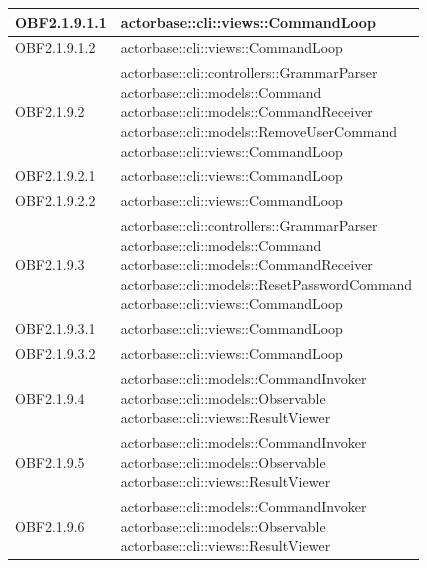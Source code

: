 \documentclass{scalatekids-article}
\begin{document}
\begin{longtable}[H]{|p{4.5cm}|p{13cm}|}
  \hline
  OBF2.1.9.1.1 & \multiLineCell[t]{actorbase::cli::views::CommandLoop\\}\\
  \hline
  OBF2.1.9.1.2 & \multiLineCell[t]{actorbase::cli::views::CommandLoop\\}\\
  \hline
  OBF2.1.9.2 & \multiLineCell[t]{actorbase::cli::controllers::GrammarParser\\actorbase::cli::models::Command\\actorbase::cli::models::CommandReceiver\\actorbase::cli::models::RemoveUserCommand\\actorbase::cli::views::CommandLoop\\}\\
  \hline
  OBF2.1.9.2.1 & \multiLineCell[t]{actorbase::cli::views::CommandLoop\\}\\
  \hline
  OBF2.1.9.2.2 & \multiLineCell[t]{actorbase::cli::views::CommandLoop\\}\\
  \hline
  OBF2.1.9.3 & \multiLineCell[t]{actorbase::cli::controllers::GrammarParser\\actorbase::cli::models::Command\\actorbase::cli::models::CommandReceiver\\actorbase::cli::models::ResetPasswordCommand\\actorbase::cli::views::CommandLoop\\}\\
  \hline
  OBF2.1.9.3.1 & \multiLineCell[t]{actorbase::cli::views::CommandLoop\\}\\
  \hline
  OBF2.1.9.3.2 & \multiLineCell[t]{actorbase::cli::views::CommandLoop\\}\\
  \hline
  OBF2.1.9.4 & \multiLineCell[t]{actorbase::cli::models::CommandInvoker\\actorbase::cli::models::Observable\\actorbase::cli::views::ResultViewer\\}\\
  \hline
  OBF2.1.9.5 & \multiLineCell[t]{actorbase::cli::models::CommandInvoker\\actorbase::cli::models::Observable\\actorbase::cli::views::ResultViewer\\}\\
  \hline
  OBF2.1.9.6 & \multiLineCell[t]{actorbase::cli::models::CommandInvoker\\actorbase::cli::models::Observable\\actorbase::cli::views::ResultViewer\\}\\
  \hline
\end{longtable}

\newpage
\appendix
\label{sec:appendice}

\newpage
\listoffigures
\end{document}
